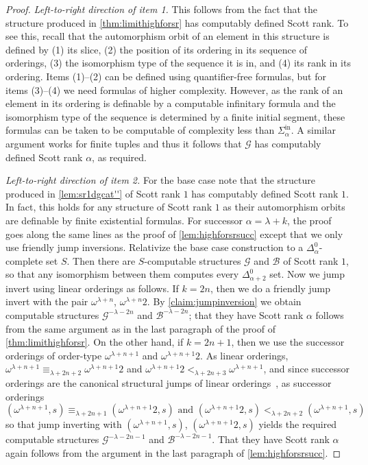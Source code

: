 \documentclass[10pt,a4paper]{amsart}
\newcommand\+[1]{\mathcal{#1}}
\renewcommand\*[1]{\mathbf{#1}}
\renewcommand\=[1]{\text{#1}}
\renewcommand\*[1]{\mathbf{#1}}
\newcommand{\Sinf}[1]{\Sigma^{\mathrm{in}}_{#1}}
\begin{document}
\begin{proof}
  \emph{Left-to-right direction of item 1.} This follows from the fact that the structure produced in \cref{thm:limithighforsr} has computably defined Scott rank. To see this, recall that the automorphism orbit of an element in this structure is defined by (1) its slice, (2) the position of its ordering in its sequence of orderings, (3) the isomorphism type of the sequence it is in, and (4) its rank in its ordering. Items (1)--(2) can be defined using quantifier-free formulas, but for items (3)--(4) we need formulas of higher complexity. However, as the rank of an element in its ordering is definable by a computable infinitary formula and the isomorphism type of the sequence is determined by a finite initial segment, these formulas can be taken to be computable of complexity less than $\Sinf\alpha$. A similar argument works for finite tuples and thus it follows that $\+G$ has computably defined Scott rank $\alpha$, as required.
  
  \emph{Left-to-right direction of item 2.} For the base case note that the structure produced in \cref{lem:sr1dgcat''} of Scott rank $1$ has computably defined Scott rank $1$. In fact, this holds for any structure of Scott rank $1$ as their automorphism orbits are definable by finite existential formulas. For successor $\alpha=\lambda+k$, the proof goes along the same lines as the proof of \cref{lem:highforsrsucc} except that we only use friendly jump inversions. Relativize the base case construction to a $\Delta^0_{\alpha}$-complete set $S$. Then there are $S$-computable structures $\+G$ and $\+B$ of Scott rank $1$, so that any isomorphism between them computes every $\Delta^0_{\alpha+2}$ set. Now we jump invert using linear orderings as follows. If $k=2n$, then we do a friendly jump invert with the pair $\omega^{\lambda+n}$, $\omega^{\lambda+n}2$. By \cref{claim:jumpinversion} we obtain computable structures $\+G^{-\lambda-2n}$ and $\+B^{-\lambda-2n}$; that they have Scott rank $\alpha$ follows from the same argument as in the last paragraph of the proof of \cref{thm:limithighforsr}. On the other hand, if $k=2n+1$, then we use the successor orderings of order-type $\omega^{\lambda+n+1}$ and $\omega^{\lambda+n+1}2$. As linear orderings, $\omega^{\lambda+n+1}\equiv_{\lambda+2n+2} \omega^{\lambda+n+1}2$ and $\omega^{\lambda+n+1}2<_{\lambda+2n+3} \omega^{\lambda+n+1}$, and since successor orderings are the canonical structural jumps of linear orderings~\cite[Chapter 10]{montalban2021}, as successor orderings
\[ (\omega^{\lambda+n+1},s)\equiv_{\lambda+2n+1} (\omega^{\lambda+n+1}2,s) \text{ and }(\omega^{\lambda+n+1}2,s)<_{\lambda+2n+2} (\omega^{\lambda+n+1},s)\]
  so that jump inverting with $(\omega^{\lambda+n+1},s)$, $(\omega^{\lambda+n+1}2,s)$ yields the required computable structures $\+G^{-\lambda-2n-1}$ and $\+B^{-\lambda-2n-1}$. That they have Scott rank $\alpha$ again follows from the argument in the last paragraph of \cref{lem:highforsrsucc}.  
\end{proof}
\end{document}
